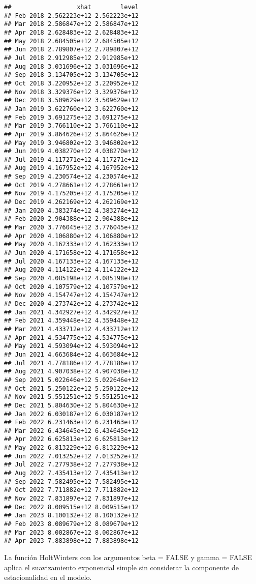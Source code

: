 \documentclass[
]{book}
\begin{document}
\begin{verbatim}
##                  xhat        level
## Feb 2018 2.562223e+12 2.562223e+12
## Mar 2018 2.586847e+12 2.586847e+12
## Apr 2018 2.628483e+12 2.628483e+12
## May 2018 2.684505e+12 2.684505e+12
## Jun 2018 2.789807e+12 2.789807e+12
## Jul 2018 2.912985e+12 2.912985e+12
## Aug 2018 3.031696e+12 3.031696e+12
## Sep 2018 3.134705e+12 3.134705e+12
## Oct 2018 3.220952e+12 3.220952e+12
## Nov 2018 3.329376e+12 3.329376e+12
## Dec 2018 3.509629e+12 3.509629e+12
## Jan 2019 3.622760e+12 3.622760e+12
## Feb 2019 3.691275e+12 3.691275e+12
## Mar 2019 3.766110e+12 3.766110e+12
## Apr 2019 3.864626e+12 3.864626e+12
## May 2019 3.946802e+12 3.946802e+12
## Jun 2019 4.038270e+12 4.038270e+12
## Jul 2019 4.117271e+12 4.117271e+12
## Aug 2019 4.167952e+12 4.167952e+12
## Sep 2019 4.230574e+12 4.230574e+12
## Oct 2019 4.278661e+12 4.278661e+12
## Nov 2019 4.175205e+12 4.175205e+12
## Dec 2019 4.262169e+12 4.262169e+12
## Jan 2020 4.383274e+12 4.383274e+12
## Feb 2020 2.904388e+12 2.904388e+12
## Mar 2020 3.776045e+12 3.776045e+12
## Apr 2020 4.106880e+12 4.106880e+12
## May 2020 4.162333e+12 4.162333e+12
## Jun 2020 4.171658e+12 4.171658e+12
## Jul 2020 4.167133e+12 4.167133e+12
## Aug 2020 4.114122e+12 4.114122e+12
## Sep 2020 4.085198e+12 4.085198e+12
## Oct 2020 4.107579e+12 4.107579e+12
## Nov 2020 4.154747e+12 4.154747e+12
## Dec 2020 4.273742e+12 4.273742e+12
## Jan 2021 4.342927e+12 4.342927e+12
## Feb 2021 4.359448e+12 4.359448e+12
## Mar 2021 4.433712e+12 4.433712e+12
## Apr 2021 4.534775e+12 4.534775e+12
## May 2021 4.593094e+12 4.593094e+12
## Jun 2021 4.663684e+12 4.663684e+12
## Jul 2021 4.778186e+12 4.778186e+12
## Aug 2021 4.907038e+12 4.907038e+12
## Sep 2021 5.022646e+12 5.022646e+12
## Oct 2021 5.250122e+12 5.250122e+12
## Nov 2021 5.551251e+12 5.551251e+12
## Dec 2021 5.804630e+12 5.804630e+12
## Jan 2022 6.030187e+12 6.030187e+12
## Feb 2022 6.231463e+12 6.231463e+12
## Mar 2022 6.434645e+12 6.434645e+12
## Apr 2022 6.625813e+12 6.625813e+12
## May 2022 6.813229e+12 6.813229e+12
## Jun 2022 7.013252e+12 7.013252e+12
## Jul 2022 7.277938e+12 7.277938e+12
## Aug 2022 7.435413e+12 7.435413e+12
## Sep 2022 7.582495e+12 7.582495e+12
## Oct 2022 7.711882e+12 7.711882e+12
## Nov 2022 7.831897e+12 7.831897e+12
## Dec 2022 8.009515e+12 8.009515e+12
## Jan 2023 8.100132e+12 8.100132e+12
## Feb 2023 8.089679e+12 8.089679e+12
## Mar 2023 8.002867e+12 8.002867e+12
## Apr 2023 7.883898e+12 7.883898e+12
\end{verbatim}

La función HoltWinters con los argumentos beta = FALSE y gamma = FALSE aplica el suavizamiento exponencial simple sin considerar la componente de estacionalidad en el modelo.
\end{document}
